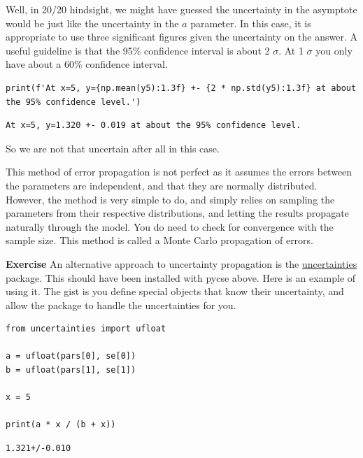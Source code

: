 \documentclass[11pt]{article}
\begin{document}
Well, in 20/20 hindsight, we might have guessed the uncertainty in the asymptote would be just like the uncertainty in the \(a\) parameter. In this case, it is appropriate to use three significant figures given the uncertainty on the answer. A useful guideline is that the 95\% confidence interval is about \textpm{} 2 \(\sigma\). At \textpm{} 1 \(\sigma\) you only have about a 60\% confidence interval.

\begin{verbatim}
print(f'At x=5, y={np.mean(y5):1.3f} +- {2 * np.std(y5):1.3f} at about the 95% confidence level.')
\end{verbatim}

\begin{verbatim}
At x=5, y=1.320 +- 0.019 at about the 95% confidence level.

\end{verbatim}

So we are not that uncertain after all in this case.

This method of error propagation is not perfect as it assumes the errors between the parameters are independent, and that they are normally distributed. However, the method is very simple to do, and simply relies on sampling the parameters from their respective distributions, and letting the results propagate naturally through the model. You do need to check for convergence with the sample size. This method is called a Monte Carlo propagation of errors.

\textbf{Exercise} An alternative approach to uncertainty propagation is the \href{https://pythonhosted.org/uncertainties/index.html}{uncertainties} package. This should have been installed with pycse above. Here is an example of using it. The gist is you define special objects that know their uncertainty, and allow the package to handle the uncertainties for you.


\begin{verbatim}
from uncertainties import ufloat

a = ufloat(pars[0], se[0])
b = ufloat(pars[1], se[1])

x = 5

print(a * x / (b + x))
\end{verbatim}

\begin{verbatim}
1.321+/-0.010

\end{verbatim}
\end{document}
